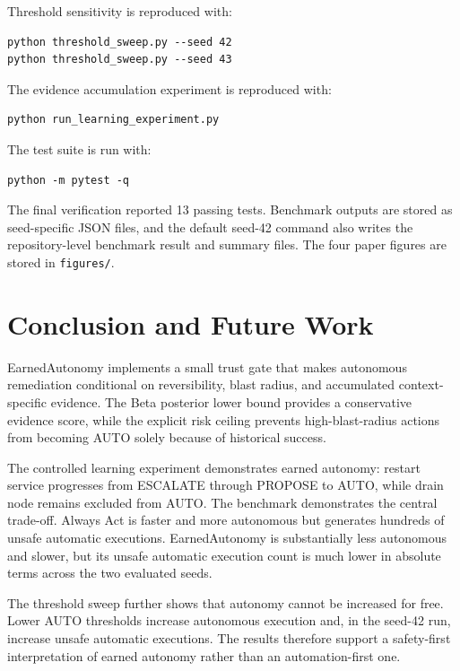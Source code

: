 \documentclass[conference]{IEEEtran}
\begin{document}
Threshold sensitivity is reproduced with:

\begin{verbatim}
python threshold_sweep.py --seed 42
python threshold_sweep.py --seed 43
\end{verbatim}

The evidence accumulation experiment is reproduced with:

\begin{verbatim}
python run_learning_experiment.py
\end{verbatim}

The test suite is run with:

\begin{verbatim}
python -m pytest -q
\end{verbatim}

The final verification reported 13 passing tests. Benchmark outputs are stored
as seed-specific JSON files, and the default seed-42 command also writes the
repository-level benchmark result and summary files. The four paper figures
are stored in \texttt{figures/}.

\section{Conclusion and Future Work}
EarnedAutonomy implements a small trust gate that makes autonomous remediation
conditional on reversibility, blast radius, and accumulated context-specific
evidence. The Beta posterior lower bound provides a conservative evidence score,
while the explicit risk ceiling prevents high-blast-radius actions from
becoming AUTO solely because of historical success.

The controlled learning experiment demonstrates earned autonomy: restart
service progresses from ESCALATE through PROPOSE to AUTO, while drain node
remains excluded from AUTO. The benchmark demonstrates the central trade-off.
Always Act is faster and more autonomous but generates hundreds of unsafe
automatic executions. EarnedAutonomy is substantially less autonomous and
slower, but its unsafe automatic execution count is much lower in absolute
terms across the two evaluated seeds.

The threshold sweep further shows that autonomy cannot be increased for free.
Lower AUTO thresholds increase autonomous execution and, in the seed-42 run,
increase unsafe automatic executions. The results therefore support a
safety-first interpretation of earned autonomy rather than an automation-first
one.
\end{document}
